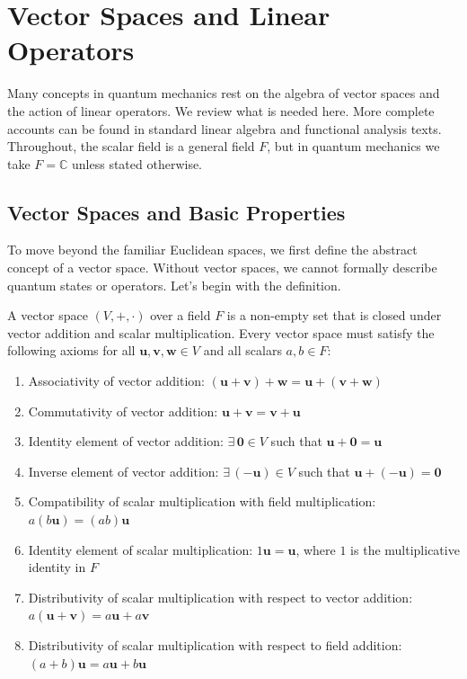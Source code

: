 \section{Vector Spaces and Linear Operators}\label{sec:vector_spaces_and_linear_operators}
Many concepts in quantum mechanics rest on the algebra of vector spaces and the action of linear operators. We review what is needed here. More complete accounts can be found in standard linear algebra and functional analysis texts.\supercite{1406837723,633612145} Throughout, the scalar field is a general field $F$, but in quantum mechanics we take $F=\mathbb{C}$ unless stated otherwise.
\subsection{Vector Spaces and Basic Properties}\label{sec:vector_spaces_basic_properties}
To move beyond the familiar Euclidean spaces, we first define the abstract concept of a vector space. Without vector spaces, we cannot formally describe quantum states or operators. Let's begin with the definition.
\begin{definition}
A vector space $(V,+,\cdot)$ over a field $F$ is a non-empty set that is closed under vector addition and scalar multiplication. Every vector space must satisfy the following axioms for all $\symbf{u},\symbf{v},\symbf{w}\in V$ and all scalars $a,b\in F$:
\begin{enumerate}[label=\arabic*.]
\item Associativity of vector addition: $(\symbf{u}+\symbf{v})+\symbf{w}=\symbf{u}+(\symbf{v}+\symbf{w})$
\item Commutativity of vector addition: $\symbf{u}+\symbf{v}=\symbf{v}+\symbf{u}$
\item Identity element of vector addition: $\exists\,\symbf{0}\in V$ such that $\symbf{u}+\symbf{0}=\symbf{u}$
\item Inverse element of vector addition: $\exists\,(-\symbf{u})\in V$ such that $\symbf{u}+(-\symbf{u})=\symbf{0}$
\item Compatibility of scalar multiplication with field multiplication: $a(b\symbf{u})=(ab)\symbf{u}$
\item Identity element of scalar multiplication: $1\symbf{u}=\symbf{u}$, where $1$ is the multiplicative identity in $F$
\item Distributivity of scalar multiplication with respect to vector addition: $a(\symbf{u}+\symbf{v})=a\symbf{u}+a\symbf{v}$
\item Distributivity of scalar multiplication with respect to field addition: $(a+b)\symbf{u}=a\symbf{u}+b\symbf{u}$
\end{enumerate}
\end{definition}
